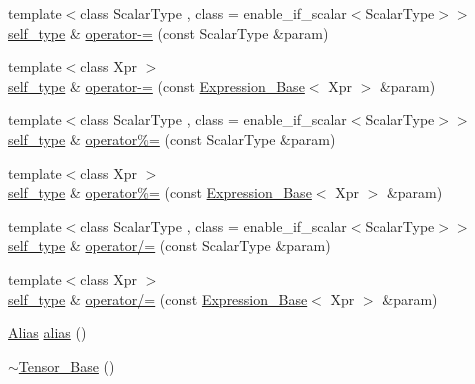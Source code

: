 \begin{DoxyCompactItemize}
\item 
{\footnotesize template$<$class Scalar\+Type , class  = enable\+\_\+if\+\_\+scalar$<$\+Scalar\+Type$>$$>$ }\\\hyperlink{classbc_1_1tensors_1_1Expression__Base}{self\+\_\+type} \& \hyperlink{classbc_1_1tensors_1_1Tensor__Base_a6be23674b50827b24c31f65b331ff6af}{operator-\/=} (const Scalar\+Type \&param)
\item 
{\footnotesize template$<$class Xpr $>$ }\\\hyperlink{classbc_1_1tensors_1_1Expression__Base}{self\+\_\+type} \& \hyperlink{classbc_1_1tensors_1_1Tensor__Base_ab20688e90b2046826b3fdbc7b0e6d58e}{operator-\/=} (const \hyperlink{classbc_1_1tensors_1_1Expression__Base}{Expression\+\_\+\+Base}$<$ Xpr $>$ \&param)
\item 
{\footnotesize template$<$class Scalar\+Type , class  = enable\+\_\+if\+\_\+scalar$<$\+Scalar\+Type$>$$>$ }\\\hyperlink{classbc_1_1tensors_1_1Expression__Base}{self\+\_\+type} \& \hyperlink{classbc_1_1tensors_1_1Tensor__Base_a6864701fc5fb5078de073762d6af4344}{operator\%=} (const Scalar\+Type \&param)
\item 
{\footnotesize template$<$class Xpr $>$ }\\\hyperlink{classbc_1_1tensors_1_1Expression__Base}{self\+\_\+type} \& \hyperlink{classbc_1_1tensors_1_1Tensor__Base_a3c14abdab393eadebaa55640dc26a4ee}{operator\%=} (const \hyperlink{classbc_1_1tensors_1_1Expression__Base}{Expression\+\_\+\+Base}$<$ Xpr $>$ \&param)
\item 
{\footnotesize template$<$class Scalar\+Type , class  = enable\+\_\+if\+\_\+scalar$<$\+Scalar\+Type$>$$>$ }\\\hyperlink{classbc_1_1tensors_1_1Expression__Base}{self\+\_\+type} \& \hyperlink{classbc_1_1tensors_1_1Tensor__Base_ad80c7c925edbc5496de75d8ae6ad4d4f}{operator/=} (const Scalar\+Type \&param)
\item 
{\footnotesize template$<$class Xpr $>$ }\\\hyperlink{classbc_1_1tensors_1_1Expression__Base}{self\+\_\+type} \& \hyperlink{classbc_1_1tensors_1_1Tensor__Base_ad5855e66ed49a73164d6c88014e3dfa1}{operator/=} (const \hyperlink{classbc_1_1tensors_1_1Expression__Base}{Expression\+\_\+\+Base}$<$ Xpr $>$ \&param)
\item 
\hyperlink{structbc_1_1tensors_1_1Tensor__Base_1_1Alias}{Alias} \hyperlink{classbc_1_1tensors_1_1Tensor__Base_a3012834f74d1604434380190c80633aa}{alias} ()
\item 
\hyperlink{classbc_1_1tensors_1_1Tensor__Base_a8954fa91e95472bd16bf4922df97f5d4}{$\sim$\+Tensor\+\_\+\+Base} ()
\end{DoxyCompactItemize}
